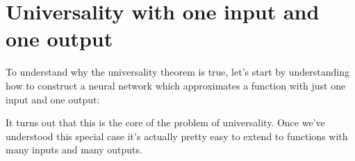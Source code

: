 \documentclass[a4paper,twoside,10pt]{book}
\begin{document}
\section{Universality with one input and one output}
To understand why the universality theorem is true, let's start by understanding how to construct a neural network which approximates a function with just one input and one output:
\begin{center} 
\end{center}
It turns out that this is the core of the problem of universality. Once we've understood this special case it's actually pretty easy to extend to functions with many inputs and many outputs.
\end{document}
